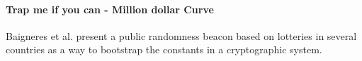 \paragraph{Trap me if you can - Million dollar Curve}
Baigneres et al. \cite{baigneres2015trap} present a public randomness beacon based on lotteries in several countries as a way to bootstrap the constants in a cryptographic system. 